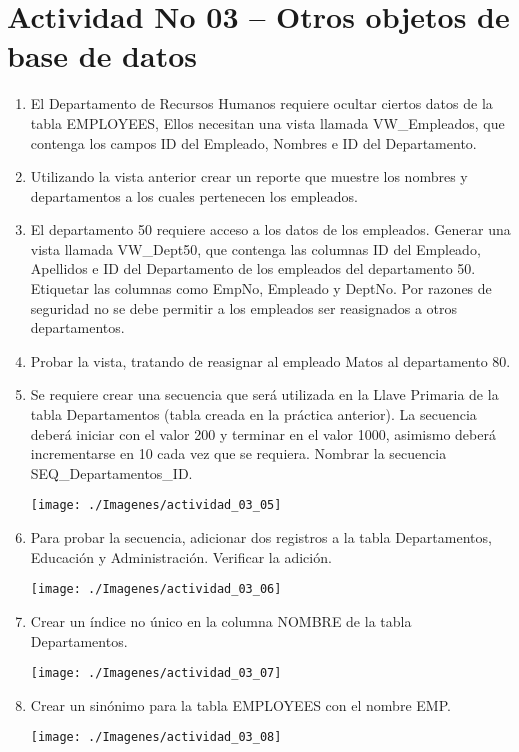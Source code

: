 \section{Actividad No 03 –  Otros objetos de base de datos} 
		
\begin{enumerate}[1.]
	\item El Departamento de Recursos Humanos requiere ocultar ciertos datos de la tabla EMPLOYEES, Ellos necesitan una vista llamada VW\_Empleados, que contenga los campos ID del Empleado, Nombres e ID del Departamento.
	\item Utilizando la vista anterior crear un reporte que muestre los nombres y departamentos a los cuales
pertenecen los empleados.
	\item El departamento 50 requiere acceso a los datos de los empleados. Generar una vista llamada VW\_Dept50, que contenga las columnas ID del Empleado, Apellidos e ID del Departamento de los empleados del departamento 50. Etiquetar las columnas como EmpNo, Empleado y DeptNo. Por razones de seguridad no se debe permitir a los empleados ser reasignados a otros departamentos.
	\item Probar la vista, tratando de reasignar al empleado Matos al departamento 80.
	\item Se requiere crear una secuencia que será utilizada en la Llave Primaria de la tabla Departamentos (tabla creada en la práctica anterior). La secuencia deberá iniciar con el valor 200 y terminar en el valor 1000, asimismo deberá incrementarse en 10 cada vez que se requiera. Nombrar la secuencia SEQ\_Departamentos\_ID.

	\begin{center}
	\texttt{[image: ./Imagenes/actividad\_03\_05]} 
	\end{center}

	\item Para probar la secuencia, adicionar dos registros a la tabla Departamentos, Educación y Administración. Verificar la adición.

	\begin{center}
	\texttt{[image: ./Imagenes/actividad\_03\_06]} 
	\end{center}

	\item Crear un índice no único en la columna NOMBRE de la tabla Departamentos.

	\begin{center}
	\texttt{[image: ./Imagenes/actividad\_03\_07]} 
	\end{center}	

	\item Crear un sinónimo para la tabla EMPLOYEES con el nombre EMP.

	\begin{center}
	\texttt{[image: ./Imagenes/actividad\_03\_08]}  
	\end{center}	

\end{enumerate}

